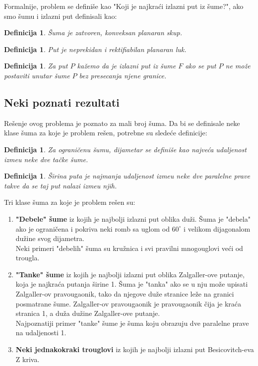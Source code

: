 \documentclass[11pt,letter]{article}
\newtheorem{df}[teo]{\bf Definicija}
\begin{document}
\indent Formalnije, problem se defini\v se kao "Koji je najkra\' ci izlazni put iz \v sume?", ako smo \v sumu i izlazni put definisali kao:
\begin{df} \v Suma je zatvoren, konveksan planaran skup. \end{df}
\begin{df} Put je neprekidan i rektifiabilan planaran luk.\end{df}
\begin{df} Za put $P$ ka\v zemo da je izlazni put iz \v sume $F$ ako se put $P$ ne mo\v ze postaviti unutar \v sume $P$ bez presecanja njene granice.  \end{df}
\subsection[Neki poznati rezultati]{Neki poznati rezultati}
\bigskip
Re\v senje ovog problema je poznato za mali broj \v suma. Da bi se definisale neke klase \v suma za koje je problem re\v sen, potrebne su slede\' ce definicije:
\begin{df} Za ograni\v cenu \v sumu, dijametar se defini\v se kao najve\' ca udaljenost izme\dj u neke dve ta\v cke \v sume.\end{df}
\begin{df} \v Sirina puta je najmanja udaljenost izme\dj u neke dve paralelne prave takve da se taj put nalazi izme\dj u njih. \end{df}

Tri klase \v suma za koje je problem re\v sen su:
\begin{enumerate}
\item \textbf{"Debele" \v sume} iz kojih je najbolji izlazni put oblika du\v zi. \v Suma je "debela" ako je ograni\v cena i pokriva neki romb sa uglom od $60^\circ$ i velikom dijagonalom du\v zine svog dijametra.
\\
Neki primeri  "debelih" \v suma su kru\v znica i svi pravilni mnogouglovi ve\' ci od trougla.
\item \textbf{"Tanke" \v sume} iz kojih je najbolji izlazni put oblika Zalgaller-ove putanje, koja je najkra\' ca putanja \v sirine 1. \v Suma je "tanka" ako se u nju mo\v ze upisati Zalgaller-ov pravougaonik, tako da njegove du\v ze stranice le\v ze na granici posmatrane \v sume. Zalgaller-ov pravougaonik je pravougaonik \v cija je kra\' ca stranica 1, a du\v za du\v zine Zalgaller-ove putanje.
\\
Najpoznatiji primer "tanke" \v sume je \v suma koju obrazuju dve paralelne prave na udaljenosti 1.
\item \textbf{Neki jednakokraki trouglovi} iz kojih je najbolji izlazni put Besicovitch-eva Z kriva.
\end{enumerate}
\smallskip
\end{document}
